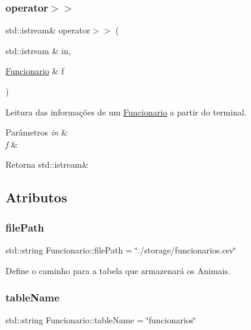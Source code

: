 \subsubsection{\texorpdfstring{operator$>$$>$}{operator>>}}
{\footnotesize\ttfamily std\+::istream\& operator$>$$>$ (\begin{DoxyParamCaption}\item[{std\+::istream \&}]{in,  }\item[{\hyperlink{classFuncionario}{Funcionario} \&}]{f }\end{DoxyParamCaption})\hspace{0.3cm}{\ttfamily [friend]}}



Leitura das informações de um \hyperlink{classFuncionario}{Funcionario} a partir do terminal. 


\begin{DoxyParams}{Parâmetros}
{\em in} & \\
\hline
{\em f} & \\
\hline
\end{DoxyParams}
\begin{DoxyReturn}{Retorna}
std\+::istream\& 
\end{DoxyReturn}


\subsection{Atributos}
\mbox{\label{classFuncionario_a15c3f1c0a9cefad48a036666c2352b60}} 
\subsubsection{\texorpdfstring{file\+Path}{filePath}}
{\footnotesize\ttfamily std\+::string Funcionario\+::file\+Path = \char`\"{}./storage/funcionarios.\+csv\char`\"{}\hspace{0.3cm}{\ttfamily [static]}}

Define o caminho para a tabela que armazenará os Animais. \mbox{\label{classFuncionario_a6c10ac916f8b0435bea51c240ca0df34}} 
\subsubsection{\texorpdfstring{table\+Name}{tableName}}
{\footnotesize\ttfamily std\+::string Funcionario\+::table\+Name = \char`\"{}funcionarios\char`\"{}\hspace{0.3cm}{\ttfamily [static]}}

